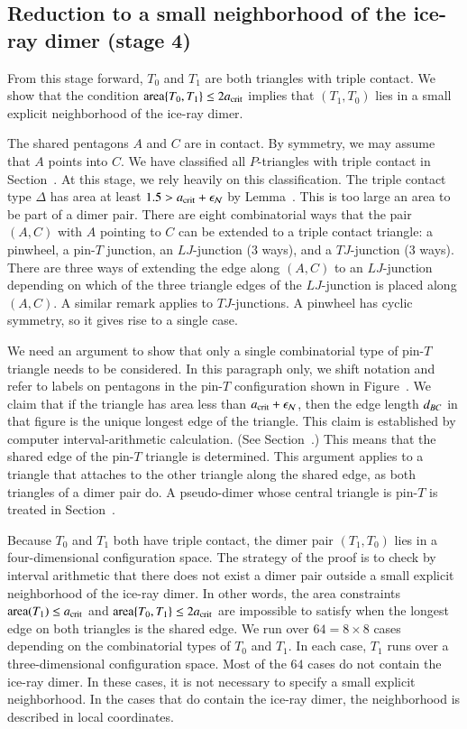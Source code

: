 \subsection{Reduction to a small neighborhood of the ice-ray
  dimer (stage 4)}

From this stage forward, $T_0$ and $T_1$ are both triangles with
triple contact.  We show that the condition ${\operatorname{area}}\{T_0,T_1\}\le
2a_\text{crit}$ implies that $(T_1,T_0)$ lies in a small explicit
neighborhood of the ice-ray dimer.

The shared pentagons $A$ and $C$ are in contact.  By symmetry, we may
assume that $A$ points into $C$.  We have classified all $P$-triangles
with triple contact in Section~.  At this stage, we
rely heavily on this classification.  The triple contact type $\Delta$
has area at least $1.5 > a_\text{crit}+\epsilon_{\mathcal N}$ by Lemma~.
This is too large an area to be part of a dimer pair.  There are eight
combinatorial ways that the pair $(A,C)$ with $A$ pointing to $C$ can
be extended to a triple contact triangle: a pinwheel, a pin-$T$
junction, an $LJ$-junction (3 ways), and a $TJ$-junction (3 ways).
There are three ways of extending the edge along $(A,C)$ to an
$LJ$-junction depending on which of the three triangle edges of the
$LJ$-junction is placed along $(A,C)$.  A similar remark applies to
$TJ$-junctions.  A pinwheel has cyclic symmetry, so it gives rise to a
single case.

We need an argument to show that only a single combinatorial type of
pin-$T$ triangle needs to be considered.  In this paragraph only, we
shift notation and refer to labels on pentagons in the pin-$T$
configuration shown in Figure~.  We claim that if
the triangle has area less than $a_\text{crit}+\epsilon_{\mathcal N}$, then the edge
length $d_{BC}$ in that figure is the unique longest edge of the
triangle.  This claim is established by computer interval-arithmetic calculation.  (See
Section~.)  This means that the shared edge of the
pin-$T$ triangle is determined.
This argument applies to a triangle that attaches to the other
triangle along the shared edge, as both triangles of a dimer pair do.
A pseudo-dimer whose central triangle is pin-$T$ is treated in
Section~.

Because $T_0$ and $T_1$ both have triple contact, the dimer pair
$(T_1,T_0)$ lies in a four-dimensional configuration space.  The
strategy of the proof is to check by interval arithmetic that there does not
exist a dimer pair outside a small explicit neighborhood of the
ice-ray dimer.  In other words, the area constraints ${\operatorname{area}}(T_1)\le
a_\text{crit}$ and ${\operatorname{area}}\{T_0,T_1\}\le2a_\text{crit}$ are impossible to satisfy
when the longest edge on both triangles is the shared edge.  We run
over $64 = 8\times 8$ cases depending on the combinatorial types of
$T_0$ and $T_1$.  In each case, $T_1$ runs over a three-dimensional
configuration space.  Most of the $64$ cases do not contain the
ice-ray dimer.  In these cases, it is not necessary to specify a small
explicit neighborhood.  In the cases that do contain the ice-ray
dimer, the neighborhood is described in local coordinates.

